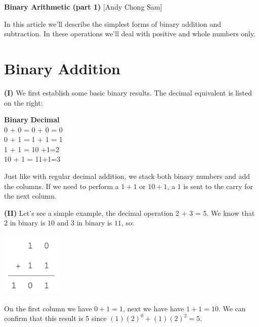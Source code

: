 \documentclass[12pt]{article}
\begin{document}
	
	\begin{center}
		\par\noindent \large \textbf{Binary Arithmetic (part 1)}  [Andy Chong Sam]
	\end{center}
	
	\par\noindent In this article we'll describe the simplest forms of binary addition and subtraction. In these operations we'll deal with positive and whole numbers only.
	
	\section{Binary Addition}
	
	\begin{minipage}[t]{.5\linewidth}
			
		\par\noindent \textbf{(I)} We first establish some basic binary results. The decimal equivalent is listed on the right:
		\begin{flalign*}
			\textbf{Binary} \;\;\;\;\;\; \textbf{Decimal} \\
			0 + 0 = 0 \;\;\;\;\; + 0 = 0 \\
			0 + 1 = 1 \;\;\;\;\; + 1 = 1 \\
			1 + 1 = 10 \;\;\;\;\;\;1+1=2 \\
			10 + 1 = 11\;\;\;\;\;\;2+1=3
		\end{flalign*}
		\par\noindent  Just like with regular decimal addition, we stack both binary numbers and add the columns. If we need to perform a \(1+1\) or \(10+1\), a \(1\) is sent to the carry for the next column.
		\newline
		\par\noindent \textbf{(II)} Let's see a simple example, the decimal operation 2 + 3 = 5. We know that 2 in binary is \(10\) and 3 in binary is \(11\), so:
		\begin{center}
		\includegraphics[width=3cm]{bin-add-1.png}
		\end{center}
		\par\noindent On the first column we have \(0+1=1\), next we have have \(1+1=10\). We can confirm that this result is 5 since \((1)(2)^0 + (1)(2)^2 = 5\).
	\end{minipage}
\end{document}
